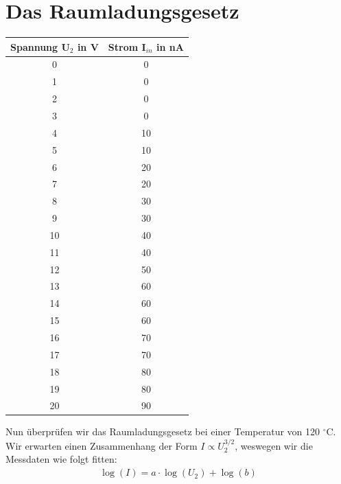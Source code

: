 \section{Das Raumladungsgesetz}
\begin{center}
	\begin{tabular}{|c|c|}
		\hline
		Spannung U$_2$ in V & Strom I$_{in}$ in nA \\ \hline
		0          &          0           \\ \hline
		1          &          0           \\ \hline
		2          &          0           \\ \hline
		3          &          0           \\ \hline
		4          &          10          \\ \hline
		5          &          10          \\ \hline
		6          &          20          \\ \hline
		7          &          20          \\ \hline
		8          &          30          \\ \hline
		9          &          30          \\ \hline
		10          &          40          \\ \hline
		11          &          40          \\ \hline
		12          &          50          \\ \hline
		13          &          60          \\ \hline
		14          &          60          \\ \hline
		15          &          60          \\ \hline
		16          &          70          \\ \hline
		17          &          70          \\ \hline
		18          &          80          \\ \hline
		19          &          80          \\ \hline
		20          &          90          \\ \hline
	\end{tabular} 
\end{center}
Nun überprüfen wir das Raumladungsgesetz bei einer Temperatur von 120 $ ^\circ $C. Wir erwarten einen Zusammenhang der Form $I\propto U_{2}^{3/2}  $, weswegen wir die Messdaten wie folgt fitten:
\begin{align*}
\log(I)=a\cdot \log(U_{2})+\log(b)
\end{align*}
